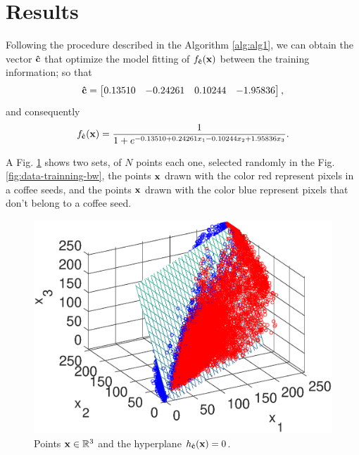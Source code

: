 \section{Results}
Following the procedure described in the Algorithm \ref{alg:alg1},
we can obtain the vector $\VECTOR{\hat{c}}$ that optimize the model fitting of 
$f_{\VECTOR{\hat{c}}}(\VECTOR{x})$ between the training information;
so that
\begin{equation}
\VECTOR{\hat{c}}=
\begin{bmatrix}
0.13510 & -0.24261 &  0.10244 & -1.95836
\end{bmatrix},
\end{equation}
and consequently
\begin{equation}
f_{\VECTOR{\hat{c}}}(\VECTOR{x})=\frac{1}{1+e^{-0.13510 + 0.24261 x_1 -0.10244 x_2 + 1.95836 x_3}}.
\end{equation}

A Fig. \ref{fig:planecoef} shows two sets, of $N$ points each one, 
selected randomly in the Fig. \ref{fig:data-trainning-bw},
the points $\VECTOR{x}$ drawn with the color red represent pixels in a coffee seeds, and
the points $\VECTOR{x}$ drawn with the color blue represent pixels that don't belong to a coffee seed.

\begin{figure}[h!]
\centering
\includegraphics[width=0.99\linewidth]{plane_coef.eps}
\caption{Points $\VECTOR{x} \in \mathbb{R}^{3}$ and the hyperplane $h_{\VECTOR{\hat{c}}}(\VECTOR{x})=0$.}
\label{fig:planecoef}
\end{figure} 

